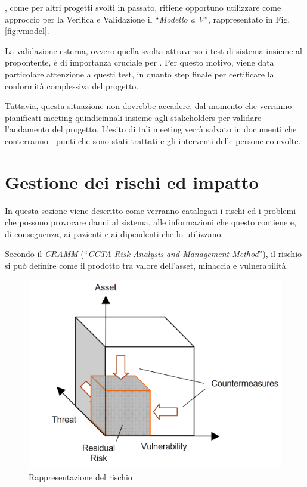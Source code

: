 	\azienda, come per altri progetti svolti in passato, ritiene opportuno utilizzare come approccio per la Verifica e Validazione il ``\textit{Modello a V}'', rappresentato in Fig. \ref{fig:vmodel}.
	
	La validazione esterna, ovvero quella svolta attraverso i test di sistema insieme al propontente, è di importanza cruciale per \azienda.
	Per questo motivo, viene data particolare attenzione a questi test, in quanto step finale per certificare la conformità complessiva del progetto.
	
	Tuttavia, questa situazione non dovrebbe accadere, dal momento che verranno pianificati meeting quindicinnali insieme agli stakeholders per validare l'andamento del progetto.
	L'esito di tali meeting verrà salvato in documenti che conterranno i punti che sono stati trattati e gli interventi delle persone coinvolte.

\newpage
\section{Gestione dei rischi ed impatto}\label{sec:rischi}

	In questa sezione viene descritto come verranno catalogati i rischi ed i problemi che possono provocare danni al sistema, alle informazioni che questo contiene e, di conseguenza, ai pazienti e ai dipendenti che lo utilizzano.
	
	Secondo il \textit{CRAMM} (``\textit{CCTA Risk Analysis and Management Method}''), il rischio si può definire come il prodotto tra valore dell'asset, minaccia e vulnerabilità.
	
	\begin{figure}[h!]
		\centering
		\includegraphics[width=\linewidth-2cm]{img/risk.png}
		\caption{Rappresentazione del rischio\cite{risk}}
		\label{fig:risk}
	\end{figure}

